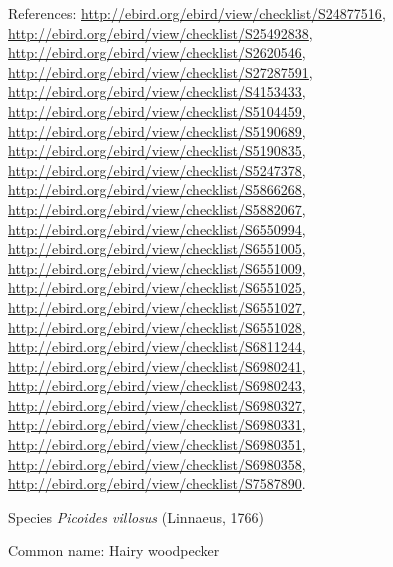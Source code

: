\documentclass[9pt, article]{memoir}
\begin{document}
\begin{multicols}{2}
References: 
\url{http://ebird.org/ebird/view/checklist/S24877516}, 
\url{http://ebird.org/ebird/view/checklist/S25492838}, 
\url{http://ebird.org/ebird/view/checklist/S2620546}, 
\url{http://ebird.org/ebird/view/checklist/S27287591}, 
\url{http://ebird.org/ebird/view/checklist/S4153433}, 
\url{http://ebird.org/ebird/view/checklist/S5104459}, 
\url{http://ebird.org/ebird/view/checklist/S5190689}, 
\url{http://ebird.org/ebird/view/checklist/S5190835}, 
\url{http://ebird.org/ebird/view/checklist/S5247378}, 
\url{http://ebird.org/ebird/view/checklist/S5866268}, 
\url{http://ebird.org/ebird/view/checklist/S5882067}, 
\url{http://ebird.org/ebird/view/checklist/S6550994}, 
\url{http://ebird.org/ebird/view/checklist/S6551005}, 
\url{http://ebird.org/ebird/view/checklist/S6551009}, 
\url{http://ebird.org/ebird/view/checklist/S6551025}, 
\url{http://ebird.org/ebird/view/checklist/S6551027}, 
\url{http://ebird.org/ebird/view/checklist/S6551028}, 
\url{http://ebird.org/ebird/view/checklist/S6811244}, 
\url{http://ebird.org/ebird/view/checklist/S6980241}, 
\url{http://ebird.org/ebird/view/checklist/S6980243}, 
\url{http://ebird.org/ebird/view/checklist/S6980327}, 
\url{http://ebird.org/ebird/view/checklist/S6980331}, 
\url{http://ebird.org/ebird/view/checklist/S6980351}, 
\url{http://ebird.org/ebird/view/checklist/S6980358}, 
\url{http://ebird.org/ebird/view/checklist/S7587890}.

\vspace{6pt}\noindent\hspace{36pt}Species \textit{Picoides villosus} (Linnaeus, 1766)


Common name: Hairy woodpecker


\end{multicols}
\end{document}

